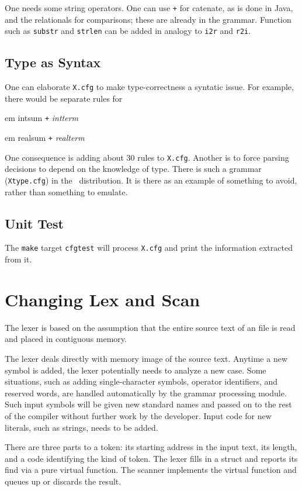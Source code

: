 One needs some string operators.  One can use {\tt+} for catenate, as is done in Java, and the relationals for comparisons; these are already in the grammar.
Function such as {\tt substr} and {\tt strlen} can be added in analogy to {\tt i2r} and {\tt r2i}.

\subsection{Type as Syntax}

One can elaborate {\tt X.cfg} to make type-correctness a syntatic issue.  For example, there would be separate rules for

{em intsum} {\tt+} {\em intterm}

{em realsum} {\tt+} {\em realterm}

One consequence is adding about 30 rules to {\tt X.cfg}.  Another is to force parsing decisions to depend on the knowledge of type.  There is such a grammar ({\tt Xtype.cfg}) in the \xcom\ distribution.  It is there as an example of something to avoid, rather than something to emulate.

\subsection{Unit Test}

The {\tt make} target {\tt cfgtest} will process {\tt X.cfg} and print the information extracted from it.

\section{Changing Lex and Scan}

The lexer is based on the assumption that the entire source text of an  file is read and placed in contiguous memory.

The lexer deals directly with memory image of the source text.  Anytime a new symbol is added, the lexer potentially needs to analyze a new case.  Some situations, such as adding single-character symbols, operator identifiers, and reserved words, are handled automatically by the grammar processing module.
Such input symbols will be given new standard names and passed on to the rest of the compiler without further work by the developer.  Input code for new literals, such as strings, needs to be added.

There are three parts to a token: its starting address in the input text, its length, and a code identifying the kind of token.  The lexer fills in a  struct and reports its find via a pure virtual function.  The scanner implements the virtual function and queues up or discards the result.

